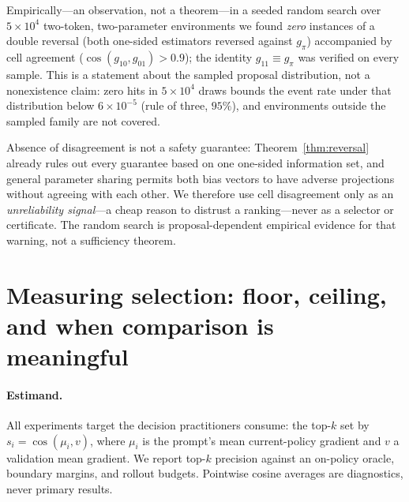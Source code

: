 \documentclass[11pt]{article}
\newcommand{\gto}{g_{10}}
\newcommand{\got}{g_{01}}
\newcommand{\gtt}{g_{11}}
\newcommand{\gpi}{g_{\pi}}
\begin{document}
Empirically---an observation, not a theorem---in a seeded random search over
$5\times 10^{4}$ two-token, two-parameter environments we found \emph{zero}
instances of a double reversal (both one-sided estimators reversed against
$\gpi$) accompanied by cell agreement ($\cos(\gto,\got)>0.9$); the identity
$\gtt\equiv\gpi$ was verified on every sample. This is a statement about the
sampled proposal distribution, not a nonexistence claim: zero hits in
$5\times10^4$ draws bounds the event rate under that distribution below
$6\times10^{-5}$ (rule of three, $95\%$), and environments outside the
sampled family are not covered.

Absence of disagreement is not a safety guarantee: Theorem~\ref{thm:reversal}
already rules out every guarantee based on one one-sided information set, and
general parameter sharing permits both bias vectors to have adverse
projections without agreeing with each other. We therefore use cell
disagreement only as an \emph{unreliability signal}---a cheap reason to
distrust a ranking---never as a selector or certificate. The random search is
proposal-dependent empirical evidence for that warning, not a sufficiency
theorem.

\section{Measuring selection: floor, ceiling, and when comparison is meaningful}
\label{sec:floor}

\paragraph{Estimand.} All experiments target the decision practitioners
consume: the top-$k$ set by $s_i=\cos(\mu_i,v)$, where $\mu_i$ is the prompt's
mean current-policy gradient and $v$ a validation mean gradient. We report
top-$k$ precision against an on-policy oracle, boundary margins, and rollout
budgets. Pointwise cosine averages are diagnostics, never primary results.
\end{document}
